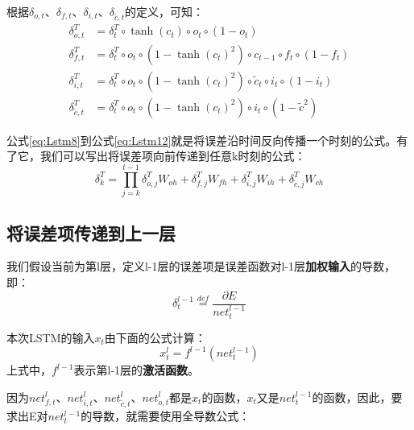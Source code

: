 根据\(\delta_{o,t}\)、\(\delta_{f,t}\)、\(\delta_{i,t}\)、\(\delta_{\tilde{c},t}\)的定义，可知：
\begin{align}
	\delta_{o,t}^T         & =\delta_t^T\circ\tanh({c}_t)\circ{o}_t\circ(1-{o}_t)\label{eq:Lstm9}                                    \\
	\delta_{f,t}^T         & =\delta_t^T\circ{o}_t\circ(1-\tanh({c}_t)^2)\circ{c}_{t-1}\circ{f}_t\circ(1-{f}_t)\label{eq:Lstm10}     \\
	\delta_{i,t}^T         & =\delta_t^T\circ{o}_t\circ(1-\tanh({c}_t)^2)\circ{\tilde{c}}_t\circ{i}_t\circ(1-{i}_t)\label{eq:Lstm11} \\
	\delta_{\tilde{c},t}^T & =\delta_t^T\circ{o}_t\circ(1-\tanh({c}_t)^2)\circ{i}_t\circ(1-{\tilde{c}}^2)\label{eq:Lstm12}
\end{align}

公式\ref{eq:Lstm8}到公式\ref{eq:Lstm12}就是将误差沿时间反向传播一个时刻的公式。有了它，我们可以写出将误差项向前传递到任意k时刻的公式：
\begin{equation}
	\label{eq:Lstm13}
	\delta_k^T=\prod_{j=k}^{t-1}\delta_{o,j}^TW_{oh}
	+\delta_{f,j}^TW_{fh}
	+\delta_{i,j}^TW_{ih}
	+\delta_{\tilde{c},j}^TW_{ch}
\end{equation}

\subsection{将误差项传递到上一层}\label{Lstm:7}

我们假设当前为第l层，定义l-1层的误差项是误差函数对l-1层\textbf{加权输入}的导数，即：
\[
	\delta_t^{l-1}\overset{def}{=}\frac{\partial{E}}{{net}_t^{l-1}}
\]

本次LSTM的输入\(x_t\)由下面的公式计算：
\[
	{x}_t^l=f^{l-1}({net}_t^{l-1})
\]
上式中，\(f^{l-1}\)表示第l-1层的\textbf{激活函数}。

因为\({net}_{f,t}^l\)、\({net}_{i,t}^l\)、\({net}_{\tilde{c},t}^l\)、\({net}_{o,t}^l\)都是\({x}_t\)的函数，\({x}_t\)又是\({net}_t^{l-1}\)的函数，因此，要求出E对\({net}_t^{l-1}\)的导数，就需要使用全导数公式：

